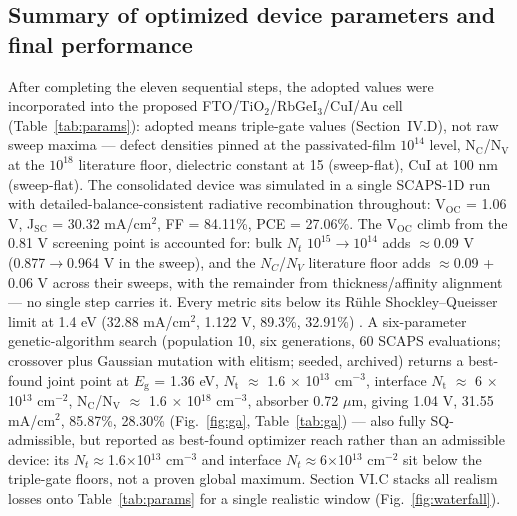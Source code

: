 \documentclass[aip,jap,amsmath,amssymb,preprint]{revtex4-2}
\begin{document}
\subsection{Summary of optimized device parameters and final performance}
After completing the eleven sequential steps, the adopted values were incorporated into the proposed FTO/\allowbreak{}TiO$_{2}$/RbGeI$_{3}$/CuI/\allowbreak{}Au cell (Table~\ref{tab:params}): adopted means triple-gate values (Section~IV.D), not raw sweep maxima --- defect densities pinned at the passivated-film $10^{14}$ level, N$_{\mathrm{C}}$/N$_{\mathrm{V}}$ at the $10^{18}$ literature floor, dielectric constant at 15 (sweep-flat), CuI at 100 nm (sweep-flat). The consolidated device was simulated in a single SCAPS-1D run with detailed-balance-consistent radiative recombination throughout: V$_{\mathrm{OC}}$ = 1.06 V, J$_{\mathrm{SC}}$ = 30.32 mA/cm$^{2}$, FF = 84.11\%, PCE = 27.06\%. The V$_{\mathrm{OC}}$ climb from the 0.81 V screening point is accounted for: bulk $N_{t}$ $10^{15}$$\rightarrow$$10^{14}$ adds $\approx$0.09 V (0.877$\rightarrow$0.964 V in the sweep), and the $N_{C}$/$N_{V}$ literature floor adds $\approx$0.09 + 0.06 V across their sweeps, with the remainder from thickness/affinity alignment --- no single step carries it. Every metric sits below its R\"uhle Shockley--Queisser limit at 1.4 eV (32.88 mA/cm$^{2}$, 1.122 V, 89.3\%, 32.91\%) \cite{r36}. A six-parameter genetic-algorithm search (population 10, six generations, 60 SCAPS evaluations; crossover plus Gaussian mutation with elitism; seeded, archived) returns a best-found joint point at $E_{\mathrm{g}}$ = 1.36 eV, $N_{\mathrm{t}}$ $\approx$ 1.6 $\times$ 10$^{13}$ cm$^{-3}$, interface $N_{\mathrm{t}}$ $\approx$ 6 $\times$ 10$^{13}$ cm$^{-2}$, N$_{\mathrm{C}}$/N$_{\mathrm{V}}$ $\approx$ 1.6 $\times$ 10$^{18}$ cm$^{-3}$, absorber 0.72 $\mu$m, giving 1.04 V, 31.55 mA/cm$^{2}$, 85.87\%, 28.30\% (Fig.~\ref{fig:ga}, Table~\ref{tab:ga}) --- also fully SQ-admissible, but reported as best-found optimizer reach rather than an admissible device: its $N_{t}$$\approx$1.6$\times$10$^{13}$ cm$^{-3}$ and interface $N_{t}$$\approx$6$\times$10$^{13}$ cm$^{-2}$ sit below the triple-gate floors, not a proven global maximum. Section VI.C stacks all realism losses onto Table~\ref{tab:params} for a single realistic window (Fig.~\ref{fig:waterfall}).
\end{document}
